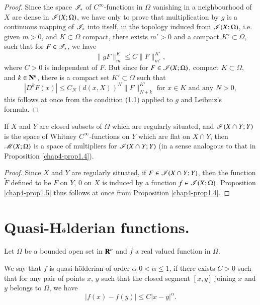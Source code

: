 \begin{proof}
 Since the space $\mathscr{I}_\ast$ of $C^\infty$-functions in $\Omega$ vanishing in a neighbourhood of $X$ are dense in $\mathscr{I} (X; \Omega)$, we have only to prove that multiplication by $g$ is a continuous mapping of $\mathscr{I}_\ast$ into itself, in the topology induced from $\mathscr{I}(X;\Omega)$, i.e. given $m >0$, and $K \subset \Omega$ compact, there exists $m' >0$ and a compact $K'\subset \Omega$, such that for $F \in \mathscr{I}_\ast$, we have
  $$
\|gF\|^K_m \leq C \| F \|^{K'}_{m'}  ,
$$\pageoriginale
where $C>0$ is independent of $F$. But since for $F \in \mathscr{I} (X; \Omega)$, compact $K \subset \Omega$, and $k \in \mathbf{N}^n$, there is a compact set $K' \subset \Omega$ such that
$$
|D^k F (x)| \leq C_N(d(x,X))^N \| F \|^{K'}_{N+k} \text{ for } x \in K \text{ and any } N > 0,
$$
this follows at once from the condition (1.1) applied to $g$ and Leibniz's formula.
\end{proof}

\begin{proposition}\label{chap4-prop1.5}%
  If $X$ and $Y$ are closed subsets of $\Omega$ which are regularly situated, and $\mathscr{I}(X \cap Y; Y)$ is the space of Whitney $C^\infty$-functions on $Y$ which are flat on $X \cap Y$, then $\mathscr{M}(X;\Omega)$ is a space of multipliers for $\mathscr{I}(X \cap Y ; Y)$ (in a sense analogous to that in Proposition \ref{chap4-prop1.4}).
\end{proposition}

\begin{proof}
Since $X$ and $Y$ are regularly situated, if $F \in \mathscr{I}(X \cap Y;Y)$, then the function $\tilde{F}$ defined to be $F$ on $Y$, 0 on $X$ is induced by a function $f \in \mathscr{I}(X;\Omega)$. Proposition \ref{chap4-prop1.5} thus follows at once from Proposition \ref{chap4-prop1.4}.
\end{proof}


\section{Quasi-H$\ddot{\rm {\bf o}}$lderian functions.} \label{chap4-sec2}

Let $\Omega$ be a bounded open set in $\mathbf{R}^n$ and $f$ a real valued function in $\Omega$.\

\begin{definition}\label{chap4-def2.1}%
We say that $f$ is quasi-h\"olderian of order $\alpha$ $0< \alpha \leq 1 $, if there exists $C > 0$ such that for any pair of points $x$, $y$ such that the closed segment $[x,y]$ joining $x$ and $y$ belongs to $\Omega$, we have 
$$
|f(x) - f (y)| \leq C |x - y|^\alpha.
$$
\end{definition}

